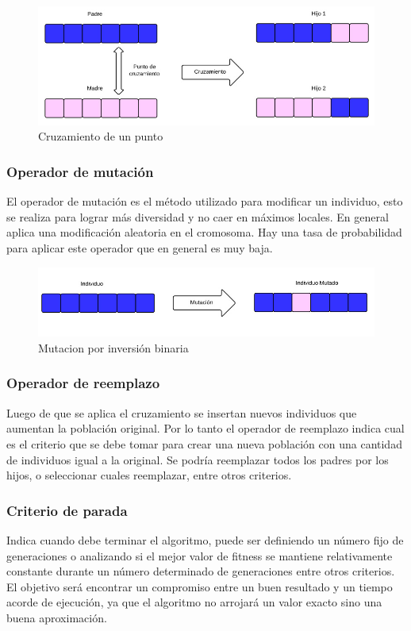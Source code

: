 \begin{figure}[h]
	\centering
	\includegraphics[width=\textwidth]{Figures/cruzamiento1}
	\caption{Cruzamiento de un punto}
	\label{fig:cruzamiento1}
\end{figure}

\subsubsection{Operador de mutación} 
El operador de mutación es el método utilizado para modificar un individuo, esto se realiza para lograr más diversidad y no caer en máximos locales. En general aplica una modificación aleatoria en el cromosoma. Hay una tasa de probabilidad para aplicar este operador que en general es muy baja. 
\begin{figure}[h]
	\centering
	\includegraphics[width=1\linewidth]{Figures/mutacion1}
	\caption{Mutacion por inversión binaria}
	\label{fig:mutacion1}
\end{figure}


\subsubsection{Operador de reemplazo} 
Luego de que se aplica el cruzamiento se insertan nuevos individuos que aumentan la población original. Por lo tanto el operador de reemplazo indica cual es el criterio que se debe tomar para crear una nueva población con una cantidad de individuos igual a la original.
Se podría reemplazar todos los padres por los hijos, o seleccionar cuales reemplazar, entre otros criterios.

\subsubsection{Criterio de parada} 
Indica cuando debe terminar el algoritmo, puede ser definiendo un número fijo de generaciones o analizando si el mejor valor de fitness se mantiene relativamente constante durante un número determinado de generaciones entre otros criterios. El objetivo será encontrar un compromiso entre un buen resultado y un tiempo acorde de ejecución, ya que el algoritmo no arrojará un valor exacto sino una buena aproximación. 

